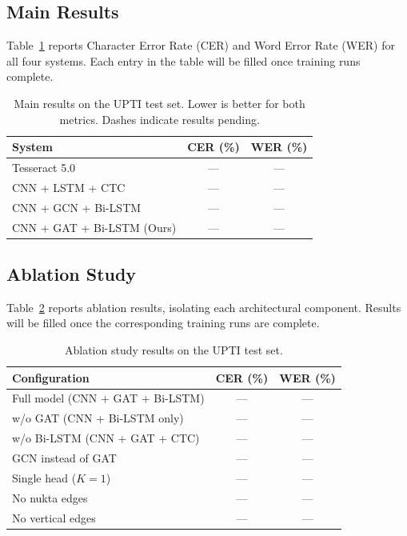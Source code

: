 \documentclass[11pt]{article}
\begin{document}
\subsection{Main Results}

Table~\ref{tab:main_results} reports Character Error Rate (CER) and Word Error Rate
(WER) for all four systems.
Each entry in the table will be filled once training runs complete.

\begin{table}[t]
\centering
\caption{Main results on the UPTI test set. Lower is better for both metrics.
         Dashes indicate results pending.}
\label{tab:main_results}
\begin{tabular}{lcc}
\toprule
\textbf{System} & \textbf{CER (\%)} & \textbf{WER (\%)} \\
\midrule
Tesseract 5.0 \citep{Smith2007}    & --- & --- \\
CNN + LSTM + CTC \citep{shi2017crnn} & --- & --- \\
CNN + GCN + Bi-LSTM                & --- & --- \\
CNN + GAT + Bi-LSTM (Ours)         & --- & --- \\
\bottomrule
\end{tabular}
\end{table}

\subsection{Ablation Study}

Table~\ref{tab:ablation_results} reports ablation results, isolating each
architectural component.
Results will be filled once the corresponding training runs are complete.

\begin{table}[t]
\centering
\caption{Ablation study results on the UPTI test set.}
\label{tab:ablation_results}
\begin{tabular}{lcc}
\toprule
\textbf{Configuration} & \textbf{CER (\%)} & \textbf{WER (\%)} \\
\midrule
Full model (CNN + GAT + Bi-LSTM)  & --- & --- \\
w/o GAT (CNN + Bi-LSTM only)      & --- & --- \\
w/o Bi-LSTM (CNN + GAT + CTC)     & --- & --- \\
GCN instead of GAT                & --- & --- \\
Single head ($K=1$)               & --- & --- \\
No nukta edges                    & --- & --- \\
No vertical edges                 & --- & --- \\
\bottomrule
\end{tabular}
\end{table}
\end{document}
